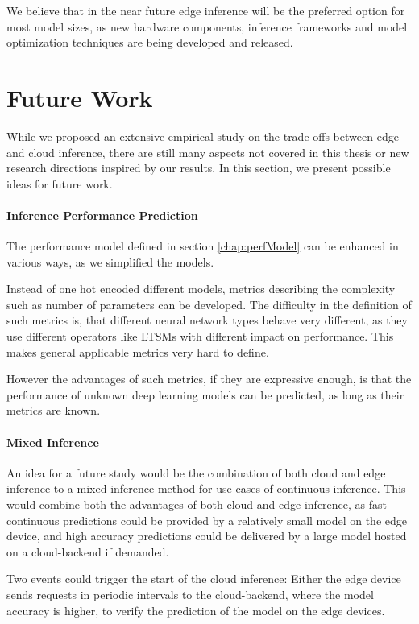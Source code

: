 


We believe that in the near future edge inference will be the preferred option for most model sizes, as new hardware components, inference frameworks and model optimization techniques are being developed and released.


\section{Future Work}
While we proposed an extensive empirical study on the trade-offs between edge and cloud inference, there are still many aspects not covered in this thesis or new research directions inspired by our results. 
In this section, we present possible ideas for future work.
\paragraph{Inference Performance Prediction}
The performance model defined in section \ref{chap:perfModel} can be enhanced in various ways, as we simplified the models.


Instead of one hot encoded different models, metrics describing the complexity such as number of parameters can be developed.
The difficulty in the definition of such metrics is, that different neural network types behave very different, as they use different operators like LTSMs with different impact on performance. 
This makes general applicable metrics very hard to define.

However the advantages of such metrics, if they are expressive enough, is that the performance of unknown deep learning models can be predicted, as long as their metrics are known.
\paragraph{Mixed Inference}
An idea for a future study would be the combination of both cloud and edge inference to a mixed inference method for use cases of continuous inference.
This would combine both the advantages of both cloud and edge inference, as fast continuous predictions could be provided by a relatively small model on the edge device, and high accuracy predictions could be delivered by a large model hosted on a cloud-backend if demanded. 

Two events could trigger the start of the cloud inference: 
Either the edge device sends requests in periodic intervals to the cloud-backend, where the model accuracy is higher, to verify the prediction of the model on the edge devices.

